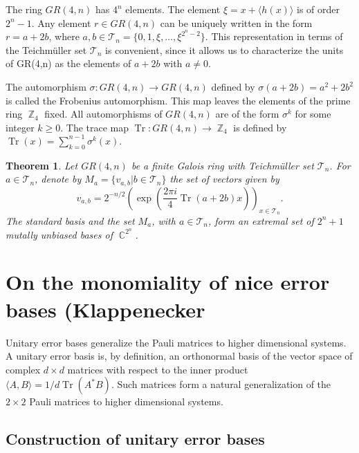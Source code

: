 \documentclass[a4paper]{article}
\DeclareMathOperator{\C}{\mathbb{C}}
\DeclareMathOperator{\Z}{\mathbb{Z}}
\DeclareMathOperator{\Tr}{Tr}
\newtheorem{theorem}{Theorem}
\begin{document}
  The ring $GR(4,n)$ has $4^{n}$ elements. The element $\xi
  = x + \langle h(x) \rangle$ is of order $2^{n}-1$. Any
  element $r \in GR(4,n)$ can be uniquely written in the
  form $r = a + 2b$, where $a,b \in \mathcal T_n =
  \{0,1,\xi,\ldots,\xi^{2^{n}-2}\}$. This representation in
  terms of the Teichmüller set $\mathcal T_n$ is convenient,
  since it allows us to characterize the units of GR(4,n) as
  the elements of $a + 2b$ with $a \neq 0$.

  The automorphism $\sigma : GR(4,n) \to GR(4,n)$ defined by
  $\sigma(a+2b) = a^2 + 2b^2$ is called the Frobenius
  automorphism. This map leaves the elements of the prime
  ring $\Z_4$ fixed. All automorphisms of $GR(4,n)$ are of
  the form $\sigma^{k}$ for some integer $k \geq 0$. The
  trace map $\Tr : GR(4,n) \to \Z_4$ is defined by $\Tr(x) =
  \sum_{k=0}^{n-1} \sigma^{k}(x).$

  \begin{theorem}
    Let $GR(4,n)$ be a finite Galois ring with Teichmüller
    set $\mathcal T_n$. For $a \in \mathcal T_n$, denote by
    $M_a = \{v_{a,b} | b \in \mathcal T_n\}$ the set of
    vectors given by
    \[
      v_{a,b}
      = 2^{-n / 2} \left( \exp\left( \frac{2\pi i}{4}
      \Tr(a+2b)x \right) \right)_{x \in \mathcal T_n}.
    \] 
    The standard basis and the set $M_a$, with $a \in
    \mathcal T_n$, form an extremal set of $2^{n}+1$ mutally
    unbiased bases of $\C^{2^{n}}$.
  \end{theorem}

  \section{On the monomiality of nice error bases
  (Klappenecker}

  Unitary error bases generalize the Pauli matrices to
  higher dimensional systems. A unitary error basis is, by
  definition, an orthonormal basis of the vector space of
  complex $d \times d$ matrices with respect to the inner
  product $\langle A,B \rangle = 1 / d \Tr(A^*B)$. Such
  matrices form a natural generalization of the $2 \times 2$ 
  Pauli matrices to higher dimensional systems.

  \subsection{Construction of unitary error bases}
\end{document}
